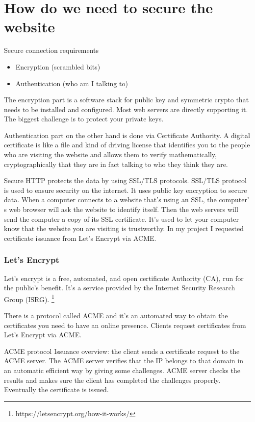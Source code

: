 \documentclass{article}
\begin{document}
\section{How do we need to secure the website}
 Secure connection requirements 
 \begin{itemize}
     
 
\item 	Encryption (scrambled bits)
\item 	Authentication (who am I talking to)
\end{itemize}

The encryption part is a software stack for public key and symmetric crypto that needs to be installed and configured. Most web servers are directly supporting it. The biggest challenge is to protect your private keys.   

Authentication part on the other hand is done via Certificate Authority. A digital certificate is like a file and kind of driving license that identifies you to the people who are visiting the website and allows them to  verify mathematically, cryptographically that  they are in fact talking to  who they think they are. 


Secure HTTP protects the data by using SSL/TLS protocols. SSL/TLS protocol is used to ensure security on the internet. It uses public key encryption to secure data. When a computer connects to a website that’s using an SSL, the computer’ s web browser will ask the website to identify itself. Then the web servers will send the computer a copy of its SSL certificate. It’s used to let your computer know that the website you are visiting is trustworthy. In my project I requested certificate issuance from Let’s Encrypt via ACME. 

\subsubsection{Let’s Encrypt}

Let’s encrypt is a free, automated, and open certificate Authority (CA), run for the public’s benefit. It’s a service provided by the Internet Security Research Group (ISRG). \footnote{https://letsencrypt.org/how-it-works/}


There is a protocol called ACME and it’s an automated way to obtain the certificates you need to have an online presence. Clients request certificates from Let’s Encrypt via ACME. 

ACME protocol Issuance overview: the client sends a certificate request to the ACME server. The ACME server verifies that the IP belongs to that domain in an automatic efficient way by giving some challenges. ACME server checks the results and makes sure the client has completed the challenges properly. Eventually the certificate is issued. 
\end{document}

